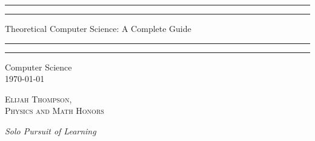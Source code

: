\documentclass[12pt, a4paper, oneside, openright, titlepage]{book}
\begin{document}

\begin{titlepage}
    \centering
    \scshape
    \vspace*{\baselineskip}
    \rule{\textwidth}{1.6pt}\vspace*{-\baselineskip}\vspace*{2pt}
    \rule{\textwidth}{0.4pt}
    
    \vspace{0.75\baselineskip}
    
    {\LARGE Theoretical Computer Science: A Complete Guide}
    
    \vspace{0.75\baselineskip}
    
    \rule{\textwidth}{0.4pt}\vspace*{-\baselineskip}\vspace{3.2pt}
    \rule{\textwidth}{1.6pt}
    
    \vspace{2\baselineskip}
    Computer Science \\
    \vspace*{3\baselineskip}
    \monthdayyeardate\today \\
    \vspace*{5.0\baselineskip}
    
    {\scshape\Large Elijah Thompson, \\ Physics and Math Honors\\}
    
    \vspace{1.0\baselineskip}
    \textit{Solo Pursuit of Learning}
    \vfill
    \enlargethispage{1in}
    \begin{figure}[b!]
    \end{figure}
\end{titlepage}
\end{document}
